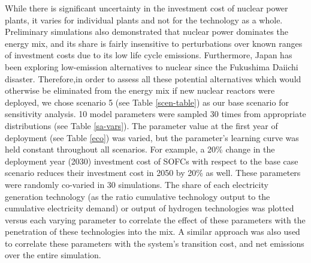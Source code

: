 While there is significant uncertainty in the investment cost of nuclear power plants, it varies for individual plants and not for the technology as a whole. Preliminary simulations also demonstrated that nuclear power dominates the energy mix, and its share is fairly insensitive to perturbations over known ranges of investment costs \cite{lovering_historical_2016} due to its low life cycle emissions. Furthermore, Japan has been exploring low-emission alternatives to nuclear since the Fukushima Daiichi disaster. Therefore,in order to assess all these potential alternatives which would otherwise be eliminated from the energy mix if new nuclear reactors were deployed, we chose scenario 5 (see Table \ref{scen-table}) as our base scenario for sensitivity analysis. 10 model parameters were sampled 30 times from appropriate distributions (see Table \ref{sa-vars}). The parameter value at the first year of deployment (see Table \ref{eco}) was varied, but the parameter's learning curve was held constant throughout all scenarios. For example, a 20\% change in the deployment year (2030) investment cost of \gls{SOFC}s with respect to the base case scenario reduces their investment cost in 2050 by 20\% as well.    These parameters were randomly co-varied in 30 simulations. The share of each electricity generation technology (as the ratio cumulative technology output to the cumulative electricity demand) or output of hydrogen technologies was plotted versus each varying parameter to correlate the effect of these parameters with the penetration of these technologies into the mix. A similar approach was also used to correlate these parameters with the system's transition cost, and net emissions over the entire simulation.

